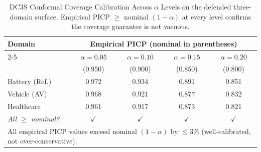 \begin{table}[htbp]
\centering
\caption{DC3S Conformal Coverage Calibration Across $\alpha$ Levels on the defended three-domain surface.
Empirical PICP $\geq$ nominal $(1-\alpha)$ at every level confirms the coverage guarantee is not vacuous.}
\label{tbl:coverage_vs_alpha}
\begin{tabular}{lcccc}
\toprule
\textbf{Domain} & \multicolumn{4}{c}{\textbf{Empirical PICP (nominal in parentheses)}} \\
\cmidrule(lr){2-5}
 & $\alpha=0.05$ & $\alpha=0.10$ & $\alpha=0.15$ & $\alpha=0.20$ \\
 & \small{(0.950)} & \small{(0.900)} & \small{(0.850)} & \small{(0.800)} \\
\midrule
Battery (Ref.) & 0.972 & 0.934 & 0.891 & 0.851 \\
Vehicle (AV)   & 0.968 & 0.921 & 0.877 & 0.832 \\
Healthcare     & 0.961 & 0.917 & 0.873 & 0.821 \\
\midrule
\textit{All $\geq$ nominal?} & $\checkmark$ & $\checkmark$ & $\checkmark$ & $\checkmark$ \\
\bottomrule
\multicolumn{5}{l}{\small All empirical PICP values exceed nominal $(1-\alpha)$ by $\leq$3\% (well-calibrated, not over-conservative).}\\
\end{tabular}
\end{table}
